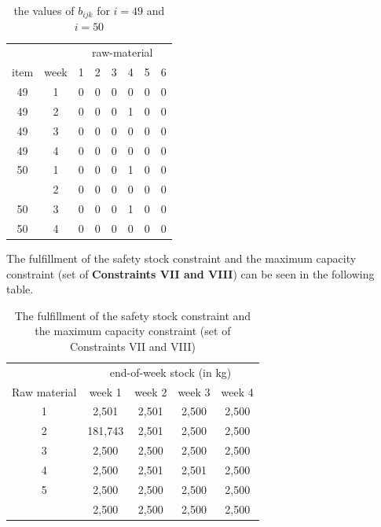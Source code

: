 \documentclass[preprint, 3p,
authoryear]{elsarticle} %
\begin{document}
\begin{table}[!h]

\caption{\label{tab:unnamed-chunk-11}the values of $b_{ijk}$ for $i = 49$ and $i = 50$}
\centering
\begin{tabular}[t]{cccccccc}
\toprule
\multicolumn{2}{c}{ } & \multicolumn{6}{c}{raw-material} \\
\cmidrule(l{3pt}r{3pt}){3-8}
item & week & 1 & 2 & 3 & 4 & 5 & 6\\
\midrule
49 & 1 & 0 & 0 & 0 & 0 & 0 & 0\\
49 & 2 & 0 & 0 & 0 & 1 & 0 & 0\\
49 & 3 & 0 & 0 & 0 & 0 & 0 & 0\\
49 & 4 & 0 & 0 & 0 & 0 & 0 & 0\\
50 & 1 & 0 & 0 & 0 & 1 & 0 & 0\\
\addlinespace
50 & 2 & 0 & 0 & 0 & 0 & 0 & 0\\
50 & 3 & 0 & 0 & 0 & 1 & 0 & 0\\
50 & 4 & 0 & 0 & 0 & 0 & 0 & 0\\
\bottomrule
\end{tabular}
\end{table}

The fulfillment of the safety stock constraint and the maximum capacity
constraint (set of \textbf{Constraints VII and VIII}) can be seen in the
following table.

\begin{table}[!h]

\caption{\label{tab:unnamed-chunk-12}The fulfillment of the safety stock constraint and the maximum capacity constraint (set of Constraints VII and VIII)}
\centering
\begin{tabular}[t]{ccccc}
\toprule
\multicolumn{1}{c}{ } & \multicolumn{4}{c}{end-of-week stock (in kg)} \\
\cmidrule(l{3pt}r{3pt}){2-5}
Raw material & week 1 & week 2 & week 3 & week 4\\
\midrule
1 & 2,501 & 2,501 & 2,500 & 2,500\\
2 & 181,743 & 2,501 & 2,500 & 2,500\\
3 & 2,500 & 2,500 & 2,500 & 2,500\\
4 & 2,500 & 2,501 & 2,501 & 2,500\\
5 & 2,500 & 2,500 & 2,500 & 2,500\\
\addlinespace
6 & 2,500 & 2,500 & 2,500 & 2,500\\
\bottomrule
\end{tabular}
\end{table}
\end{document}
